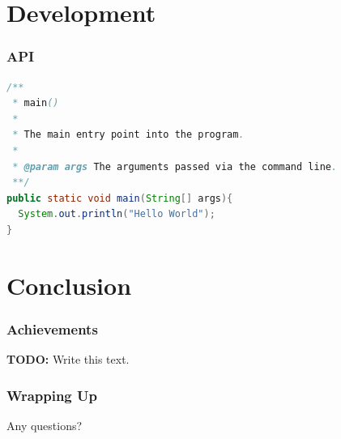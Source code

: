 \documentclass[10pt]{beamer}
\begin{document}
  \section[Dev]{Development}
  \begin{frame}[fragile=singleslide]
    \frametitle{API}
    \begin{lstlisting}[caption=Java Hello World,language=Java]
/**
 * main()
 *
 * The main entry point into the program.
 *
 * @param args The arguments passed via the command line.
 **/
public static void main(String[] args){
  System.out.println("Hello World");
}
    \end{lstlisting}
  \end{frame}
  \section[End]{Conclusion}
  \begin{frame}
    \frametitle{Achievements}
    \textbf{TODO:} Write this text.
  \end{frame}
  \begin{frame}
    \frametitle{Wrapping Up}
    \begin{block}{}
      \centering
      Any questions?
    \end{block}
  \end{frame}
\end{document}
